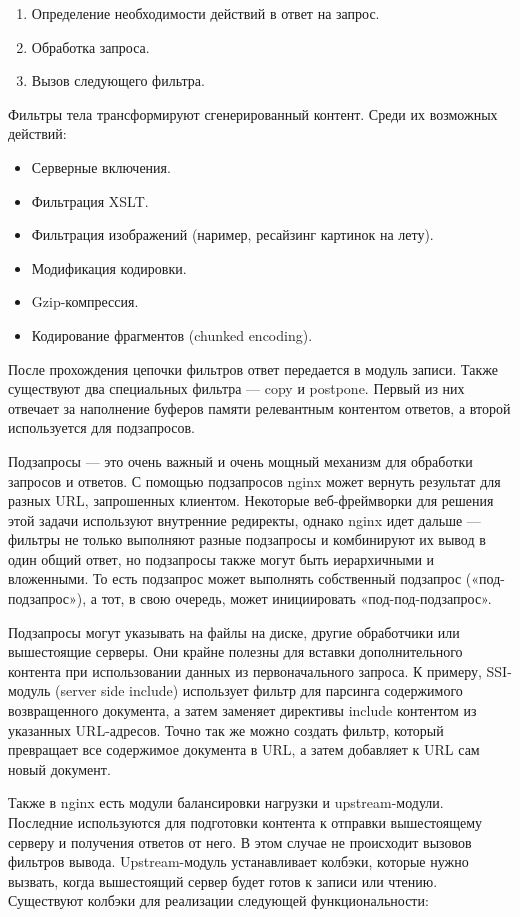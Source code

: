\documentclass[14pt, a4paper]{article}
\begin{document}
\begin{enumerate}
    \item Определение необходимости действий в ответ на запрос.
    \item Обработка запроса.
    \item Вызов следующего фильтра.
\end{enumerate}
Фильтры тела трансформируют сгенерированный контент. Среди их возможных действий:
\begin{itemize}
    \item Серверные включения.
    \item Фильтрация XSLT.
    \item Фильтрация изображений (наример, ресайзинг картинок на лету).
    \item Модификация кодировки.
    \item Gzip-компрессия.
    \item Кодирование фрагментов (chunked encoding).
\end{itemize}
После прохождения цепочки фильтров ответ передается в модуль записи. Также существуют два специальных 
фильтра — copy и postpone. Первый из них отвечает за наполнение буферов памяти релевантным контентом 
ответов, а второй используется для подзапросов.

Подзапросы — это очень важный и очень мощный механизм для обработки запросов и ответов. 
С помощью подзапросов nginx может вернуть результат для разных URL, запрошенных клиентом. 
Некоторые веб-фреймворки для решения этой задачи используют внутренние редиректы, однако 
nginx идет дальше — фильтры не только выполняют разные подзапросы и комбинируют их вывод 
в один общий ответ, но подзапросы также могут быть иерархичными и вложенными. То есть 
подзапрос может выполнять собственный подзапрос («под-подзапрос»), а тот, в свою очередь, 
может инициировать «под-под-подзапрос».

Подзапросы могут указывать на файлы на диске, другие обработчики или вышестоящие серверы. 
Они крайне полезны для вставки дополнительного контента при использовании данных из 
первоначального запроса. К примеру, SSI-модуль (server side include) использует фильтр 
для парсинга содержимого возвращенного документа, а затем заменяет директивы include 
контентом из указанных URL-адресов. Точно так же можно создать фильтр, который превращает 
все содержимое документа в URL, а затем добавляет к URL сам новый документ.

Также в nginx есть модули балансировки нагрузки и upstream-модули. Последние используются 
для подготовки контента к отправки вышестоящему серверу и получения ответов от него. В 
этом случае не происходит вызовов фильтров вывода. Upstream-модуль устанавливает колбэки, 
которые нужно вызвать, когда вышестоящий сервер будет готов к записи или чтению. Существуют 
колбэки для реализации следующей функциональности:
\end{document}
